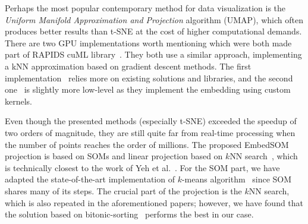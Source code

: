 
Perhaps the most popular contemporary method for data visualization is the \emph{Uniform Manifold Approximation and Projection} algorithm (UMAP), which often produces better results than t-SNE at the cost of higher computational demands. There are two GPU implementations worth mentioning which were both made part of RAPIDS cuML library~\cite{tegegne2021parallel, nolet2020bringing}. They both use a similar approach, implementing a kNN approximation based on gradient descent methods. The first implementation~\cite{tegegne2021parallel} relies more on existing solutions and libraries, and the second one~\cite{nolet2020bringing} is slightly more low-level as they implement the embedding using custom kernels.

Even though the presented methods (especially t-SNE) exceeded the speedup of two orders of magnitude, they are still quite far from real-time processing when the number of points reaches the order of millions. The proposed EmbedSOM projection is based on SOMs and linear projection based on $k$NN search~\cite{kratochvil2019generalized,kratochvil2020shinysom}, which is technically closest to the work of Yeh et al.~\cite{yeh2010efficient}. For the SOM part, we have adapted the state-of-the-art implementation of $k$-means algorithm~\cite{krulis2020detailed} since SOM shares many of its steps. The crucial part of the projection is the $k$NN search, which is also repeated in the aforementioned papers; however, we have found that the solution based on bitonic-sorting~\cite{krulivs2015optimizing} performs the best in our case.

